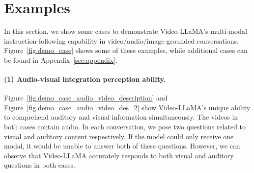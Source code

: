 \documentclass[11pt]{article}
\begin{document}
\section{Examples}
In this section, we show some cases to demonstrate Video-LLaMA's  multi-modal instruction-following capability in video/audio/image-grounded conversations. Figure~\ref{fig.demo_case} shows some of these examples, while additional cases can be found in  Appendix~\ref{sec:appendix}.

\begin{figure*}[t]
    \centering
    \vspace{-0.5cm}
        \quad
        
        
    \quad
\caption{Some examples generated by Video-LLaMA. }
    \label{fig.demo_case}
    \vspace{-0.3cm}
\end{figure*}



\paragraph{(1) Audio-visual integration perception ability.} Figure~\ref{fig.demo_case_audio_video_description} and Figure~\ref{fig.demo_case_audio_video_des_2} show Video-LLaMA's unique ability to comprehend auditory and visual information simultaneously. The videos in both cases contain audio. In each conversation, we pose two questions related to visual and auditory content respectively.  If the model could only receive one modal, it would be unable to answer both of these questions. However, we can observe that Video-LLaMA accurately responds to both visual and auditory questions in both cases.
\end{document}
